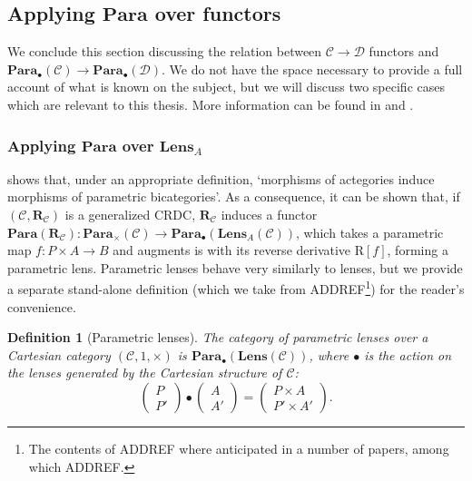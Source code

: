 \documentclass[12pt,a4paper,openright,twoside]{report}
\theoremstyle{plain}
\newtheorem{definition}[proposition]{Definition}
\theoremstyle{definition}
\begin{document}
\subsection{Applying $\mathbf{Para}$ over functors}

We conclude this section discussing the relation between $\mathcal{C} \to \mathcal{D}$ functors and $\mathbf{Para}_{\bullet}(\mathcal{C}) \to \mathbf{Para}_{\bullet}(\mathcal{D})$. We do not have the space necessary to provide a full account of what is known on the subject, but we will discuss two specific cases which are relevant to this thesis. More information can be found in \cite{gavranovic2024fundamental} and \cite{gavranovicposition}.


\subsubsection{Applying $\mathbf{Para}$ over $\mathbf{Lens}_A$}

\cite{gavranovic2024fundamental} shows that, under an appropriate definition, \lq morphisms of actegories induce morphisms of parametric bicategories\rq. As a consequence, it can be shown that, if  $(\mathcal{C}, \mathbf{R}_{\mathcal{C}})$ is a generalized CRDC,  $\mathbf{R}_{\mathcal{C}}$ induces a functor $\mathbf{Para}(\mathbf{R}_{\mathcal{C}}): \mathbf{Para}_{\times}(\mathcal{C}) \to \mathbf{Para}_{\bullet}(\mathbf{Lens}_A(\mathcal{C}))$, which takes a parametric map $f: P \times A \to B$ and augments is with its reverse derivative $\mathrm{R}[f]$, forming a parametric lens. Parametric lenses behave very similarly to lenses, but we provide a separate stand-alone definition (which we take from ADDREF\footnote{The contents of ADDREF where anticipated in a number of papers, among which ADDREF.}) for the reader's convenience.

\begin{definition}[Parametric lenses]
  The category of parametric lenses over a Cartesian category $(\mathcal{C},1,\times)$ is $\mathbf{Para}_{\bullet}(\mathbf{Lens}(\mathcal{C}))$, where $\bullet$ is the action on the lenses generated by the Cartesian structure of $\mathcal{C}$:
  \[\begin{pmatrix}
    P \\ P'
  \end{pmatrix} \bullet \begin{pmatrix}
    A \\ A'
  \end{pmatrix} = \begin{pmatrix}
    P \times A \\ P' \times A'
  \end{pmatrix}.\]
\end{definition}
\end{document}
